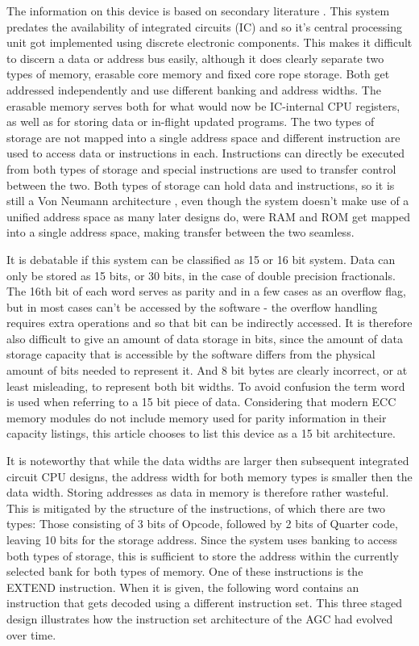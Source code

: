\documentclass[twoside,twocolumn]{article}
\begin{document}
The information on this device is based on secondary literature \cite{agc}. This system
predates the availability of integrated circuits (IC) and so it's central processing unit
got implemented using discrete electronic components. This makes it difficult to discern
a data or address bus easily, although it does clearly separate two types of memory,
erasable core memory and fixed core rope storage. Both get addressed independently and
use different banking and address widths. The erasable memory serves both for what would
now be IC-internal CPU registers, as well as for storing data or in-flight updated
programs. The two types of storage are not mapped into a single address space and
different instruction are used to access data or instructions in each. Instructions can
directly be executed from both types of storage and special instructions are used to
transfer control between the two. Both types of storage can hold data and instructions,
so it is still a Von Neumann architecture \cite{edvac}, even though the system doesn't
make use of a unified address space as many later designs do, were RAM and ROM get mapped
into a single address space, making transfer between the two seamless.

It is debatable if this system can be classified as 15 or 16 bit system. Data can only be
stored as 15 bits, or 30 bits, in the case of double precision fractionals. The 16th bit
of each word serves as parity and in a few cases as an overflow flag, but in most cases
can't be accessed by the software - the overflow handling requires extra operations and
so that bit can be indirectly accessed. It is therefore also difficult to give an amount
of data storage in bits, since the amount of data storage capacity that is accessible by
the software differs from the physical amount of bits needed to represent it. And 8 bit
bytes are clearly incorrect, or at least misleading, to represent both bit widths. To avoid
confusion the term word is used when referring to a 15 bit piece of data. Considering
that modern ECC memory modules do not include memory used for parity information in their
capacity listings, this article chooses to list this device as a 15 bit architecture.

It is noteworthy that while the data widths are larger then subsequent integrated circuit
CPU designs, the address width for both memory types is smaller then the data width.
Storing addresses as data in memory is therefore rather wasteful. This is mitigated by
the structure of the instructions, of which there are two types: Those consisting of 3
bits of Opcode, followed by 2 bits of Quarter code, leaving 10 bits for the storage
address. Since the system uses banking to access both types of storage, this is
sufficient to store the address within the currently selected bank for both types of
memory. One of these instructions is the EXTEND instruction. When it is given, the
following word contains an instruction that gets decoded using a different instruction
set. This three staged design illustrates how the instruction set architecture of the AGC
had evolved over time.
\end{document}
